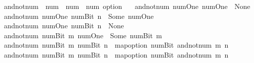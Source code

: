\begin{isabellebody}
\endisatagproof
{\isafoldproof}%
%
\isadelimproof
\isanewline
%
\endisadelimproof
\isanewline
{}\isamarkupfalse%
\ and{\isacharunderscore}{\kern0pt}not{\isacharunderscore}{\kern0pt}num\ {\isacharcolon}{\kern0pt}{\isacharcolon}{\kern0pt}\ {\isacartoucheopen}num\ {\isasymRightarrow}\ num\ {\isasymRightarrow}\ num\ option{\isacartoucheclose}\ \isanewline
{}\isanewline
\ \ {\isacartoucheopen}and{\isacharunderscore}{\kern0pt}not{\isacharunderscore}{\kern0pt}num\ num{\isachardot}{\kern0pt}One\ num{\isachardot}{\kern0pt}One\ {\isacharequal}{\kern0pt}\ None{\isacartoucheclose}\isanewline
{\isacharbar}{\kern0pt}\ {\isacartoucheopen}and{\isacharunderscore}{\kern0pt}not{\isacharunderscore}{\kern0pt}num\ num{\isachardot}{\kern0pt}One\ {\isacharparenleft}{\kern0pt}num{\isachardot}{\kern0pt}Bit{}\ n{\isacharparenright}{\kern0pt}\ {\isacharequal}{\kern0pt}\ Some\ num{\isachardot}{\kern0pt}One{\isacartoucheclose}\isanewline
{\isacharbar}{\kern0pt}\ {\isacartoucheopen}and{\isacharunderscore}{\kern0pt}not{\isacharunderscore}{\kern0pt}num\ num{\isachardot}{\kern0pt}One\ {\isacharparenleft}{\kern0pt}num{\isachardot}{\kern0pt}Bit{}\ n{\isacharparenright}{\kern0pt}\ {\isacharequal}{\kern0pt}\ None{\isacartoucheclose}\isanewline
{\isacharbar}{\kern0pt}\ {\isacartoucheopen}and{\isacharunderscore}{\kern0pt}not{\isacharunderscore}{\kern0pt}num\ {\isacharparenleft}{\kern0pt}num{\isachardot}{\kern0pt}Bit{}\ m{\isacharparenright}{\kern0pt}\ num{\isachardot}{\kern0pt}One\ {\isacharequal}{\kern0pt}\ Some\ {\isacharparenleft}{\kern0pt}num{\isachardot}{\kern0pt}Bit{}\ m{\isacharparenright}{\kern0pt}{\isacartoucheclose}\isanewline
{\isacharbar}{\kern0pt}\ {\isacartoucheopen}and{\isacharunderscore}{\kern0pt}not{\isacharunderscore}{\kern0pt}num\ {\isacharparenleft}{\kern0pt}num{\isachardot}{\kern0pt}Bit{}\ m{\isacharparenright}{\kern0pt}\ {\isacharparenleft}{\kern0pt}num{\isachardot}{\kern0pt}Bit{}\ n{\isacharparenright}{\kern0pt}\ {\isacharequal}{\kern0pt}\ map{\isacharunderscore}{\kern0pt}option\ num{\isachardot}{\kern0pt}Bit{}\ {\isacharparenleft}{\kern0pt}and{\isacharunderscore}{\kern0pt}not{\isacharunderscore}{\kern0pt}num\ m\ n{\isacharparenright}{\kern0pt}{\isacartoucheclose}\isanewline
{\isacharbar}{\kern0pt}\ {\isacartoucheopen}and{\isacharunderscore}{\kern0pt}not{\isacharunderscore}{\kern0pt}num\ {\isacharparenleft}{\kern0pt}num{\isachardot}{\kern0pt}Bit{}\ m{\isacharparenright}{\kern0pt}\ {\isacharparenleft}{\kern0pt}num{\isachardot}{\kern0pt}Bit{}\ n{\isacharparenright}{\kern0pt}\ {\isacharequal}{\kern0pt}\ map{\isacharunderscore}{\kern0pt}option\ num{\isachardot}{\kern0pt}Bit{}\ {\isacharparenleft}{\kern0pt}and{\isacharunderscore}{\kern0pt}not{\isacharunderscore}{\kern0pt}num\ m\ n{\isacharparenright}{\kern0pt}{\isacartoucheclose}\isanewline

\end{isabellebody}
